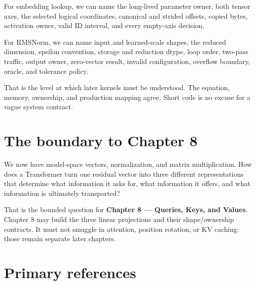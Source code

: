 For embedding lookup, we can name the long-lived parameter owner, both
tensor axes, the selected logical coordinates, canonical and strided
offsets, copied bytes, activation owner, valid ID interval, and every
empty-axis decision.

For RMSNorm, we can name input and learned-scale shapes, the reduced
dimension, epsilon convention, storage and reduction dtype, loop order,
two-pass traffic, output owner, zero-vector result, invalid
configuration, overflow boundary, oracle, and tolerance policy.

That is the level at which later kernels must be understood. The
equation, memory, ownership, and production mapping agree. Short code is
no excuse for a vague system contract.

\section{The boundary to Chapter 8}\label{the-boundary-to-chapter-8}

We now have model-space vectors, normalization, and matrix
multiplication. How does a Transformer turn one residual vector into
three different representations that determine what information it asks
for, what information it offers, and what information is ultimately
transported?

That is the bounded question for \textbf{Chapter 8 --- Queries, Keys,
and Values}. Chapter 8 may build the three linear projections and their
shape/ownership contracts. It must not smuggle in attention, position
rotation, or KV caching: those remain separate later chapters.

\section{Primary references}\label{primary-references-2}

